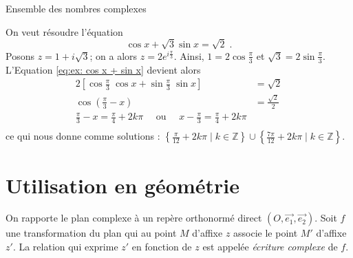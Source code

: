 \begin{chapter}{Ensemble des nombres complexes}
\begin{ex}
On veut r\'esoudre l'\'equation 
\begin{equation}
\cos x + \sqrt{3} \sin x = \sqrt{2} \; .
\label{eq:ex: cos x + sin x}
\end{equation}
Posons $z = 1 + i \sqrt{3}$; on a alors $z = 2 e^{i \frac{\pi}{3}}$.
Ainsi, $1 = 2 \cos \frac{\pi}{3}$ et $\sqrt{3} = 2 \sin \frac{\pi}{3}$.
L'Equation \ref{eq:ex: cos x + sin x} devient alors 
\begin{align*}
2 \left[ \cos \frac{\pi}{3} \; \cos x + \sin \frac{\pi}{3} \; \sin x \right] & = \sqrt{2} \\
\cos \left( \frac{\pi}{3} - x \right) & = \frac{\sqrt{2}}{2} \\
\frac{\pi}{3} - x = \frac{\pi}{4} + 2 k \pi \quad \text{ ou } \quad x - \frac{\pi}{3} = \frac{\pi}{4} + 2 k \pi \\
\end{align*}
ce qui nous donne comme solutions : 
$
\left\lbrace \frac{\pi}{12} + 2 k \pi \mid k \in \mathbb{Z} \right\rbrace 
\cup 
\left\lbrace \frac{7 \pi }{12} + 2 k \pi \mid k \in \mathbb{Z} \right\rbrace
$.
\end{ex}
%
\section{Utilisation en g\'eom\'etrie}
%
%
On rapporte le plan complexe \`a un rep\`ere orthonorm\'e direct $(O,\vec{e_1},\vec{e_2})$.
Soit $f$ une transformation du plan qui au point $M$ d'affixe $z$ associe le point $M'$ d'affixe $z'$.
La relation qui exprime $z'$ en fonction de $z$ est appel\'ee \emph{\'ecriture complexe} de $f$.
%

\end{chapter}
